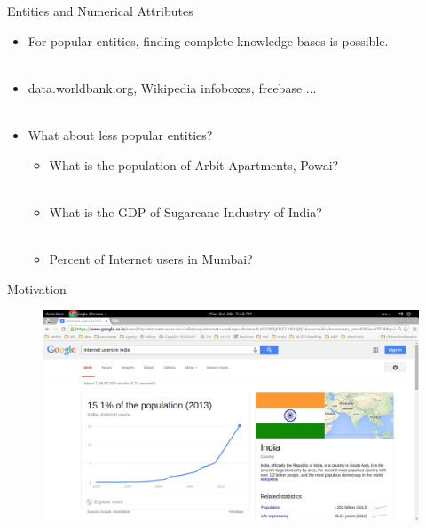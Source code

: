 \documentclass{beamer}
\begin{document}
\begin{frame}{Entities and Numerical Attributes}
 
 \begin{itemize}

  \item For popular entities, finding complete knowledge bases is possible. \pause \\~\\
  \item data.worldbank.org, Wikipedia infoboxes, freebase ... \pause \\~\\
  \item What about less popular entities?  \pause 
    \begin{itemize}
      \item What is the population of Arbit Apartments, Powai? \pause \\~\\
      \item What is the GDP of Sugarcane Industry of India? \pause \\~\\
      \item Percent of Internet users in Mumbai? 
    \end{itemize}
 \end{itemize} 
\end{frame}

\begin{frame}{Motivation}
 \begin{figure}[h]
 \centering
 \includegraphics[bb=0 0 1366 741,scale=0.25]{./imgs/resultindia.png}
\end{figure}
\end{frame}
\end{document}
